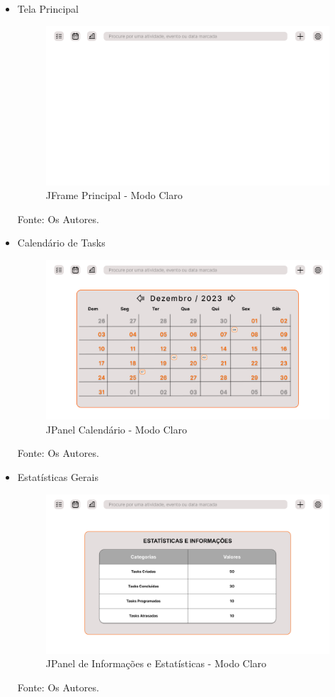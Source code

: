 \documentclass[a4paper,12pt]{article}
\begin{document}
\begin{itemize}
	\item Tela Principal
	\begin{figure}[H]
		\centering
		\includegraphics[scale=0.19]{prototypes/white/Main Window.png}
		\caption{JFrame Principal - Modo Claro}
	\end{figure}
	\noindent Fonte: Os Autores.

	\item Calendário de Tasks
	\begin{figure}[H]
		\centering
		\includegraphics[scale=0.19]{prototypes/white/Calendar Panel Window.png}
		\caption{JPanel Calendário - Modo Claro}
	\end{figure}	
	\noindent Fonte: Os Autores.

	\pagebreak
	\item Estatísticas Gerais
	\begin{figure}[H]
		\centering
		\includegraphics[scale=0.19]{prototypes/white/Stats Panel Window.png}
		\caption{JPanel de Informações e Estatísticas - Modo Claro}
	\end{figure}
	\noindent Fonte: Os Autores.


\end{itemize}
\end{document}
